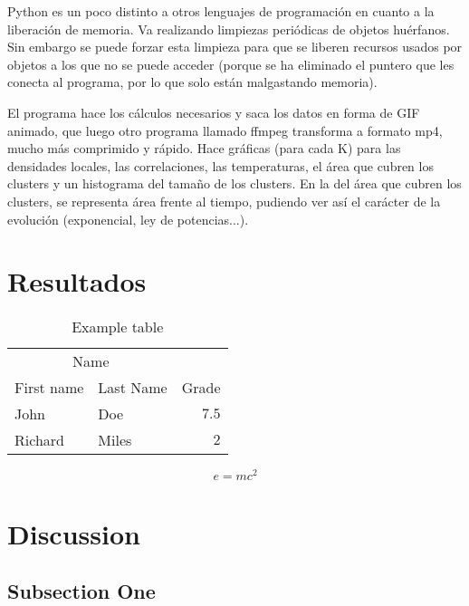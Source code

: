 \documentclass[twoside]{article}
\begin{document}
\begin{multicols}{2}
Python es un poco distinto a otros lenguajes de programaci\'on en cuanto a la liberaci\'on de memoria. Va realizando limpiezas peri\'odicas de objetos hu\'erfanos. Sin embargo se puede forzar esta limpieza para que se liberen recursos usados por objetos a los que no se puede acceder (porque se ha eliminado el puntero que les conecta al programa, por lo que solo est\'an malgastando memoria).

El programa hace los c\'alculos necesarios y saca los datos en forma de GIF animado, que luego otro programa llamado ffmpeg transforma a formato mp4, mucho m\'as comprimido y r\'apido. Hace gr\'aficas (para cada K) para las densidades locales, las correlaciones, las temperaturas, el \'area que cubren los clusters y un histograma del tama\~no de los clusters. En la del \'area que cubren los clusters, se representa \'area frente al tiempo, pudiendo ver as\'i el car\'acter de la evoluci\'on (exponencial, ley de potencias...).



\section*{Resultados}

\begin{table}[H]
\caption{Example table}
\centering
\begin{tabular}{llr}
\toprule
\multicolumn{2}{c}{Name} \\
\cmidrule(r){1-2}
First name & Last Name & Grade \\
\midrule
John & Doe & $7.5$ \\
Richard & Miles & $2$ \\
\bottomrule
\end{tabular}
\end{table}

\lipsum[5] %

\begin{equation}
\label{eq:emc}
e = mc^2
\end{equation}

\lipsum[6] %


\section{Discussion}

\subsection{Subsection One}


\end{multicols}
\end{document}
